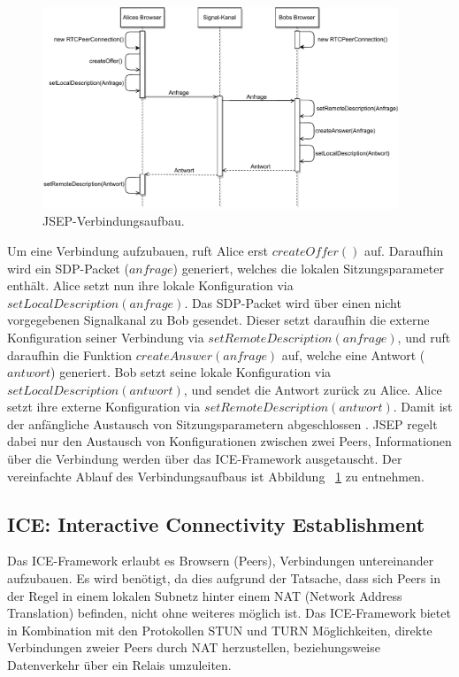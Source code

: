\begin{figure}[h]
\centering
\includegraphics[width=0.95\textwidth]{bilder/PDF_SVG/JSEP.pdf}
\caption{\acs{JSEP}-Verbindungsaufbau.}
\label{fig:jsep}
\end{figure}

Um eine Verbindung aufzubauen, ruft Alice erst $createOffer()$ auf. Daraufhin wird ein SDP-Packet ($anfrage$) generiert, welches die lokalen Sitzungsparameter enthält. Alice setzt nun ihre lokale Konfiguration via $setLocalDescription(anfrage)$. Das \acs{SDP}-Packet wird über einen nicht vorgegebenen Signalkanal zu Bob gesendet. Dieser setzt daraufhin die externe Konfiguration seiner Verbindung via $setRemoteDescription(anfrage)$, und ruft daraufhin die Funktion $createAnswer(anfrage)$ auf, welche eine Antwort ($antwort$) generiert. Bob setzt seine lokale Konfiguration via $setLocalDescription(antwort)$, und sendet die Antwort zurück zu Alice. Alice setzt ihre externe Konfiguration via $setRemoteDescription(antwort)$. Damit ist der anfängliche Austausch von Sitzungsparametern abgeschlossen \cite{altanai2014}. \acs{JSEP} regelt dabei nur den Austausch von Konfigurationen zwischen zwei Peers, Informationen über die Verbindung werden über das \acs{ICE}-Framework ausgetauscht. Der vereinfachte Ablauf des Verbindungsaufbaus ist Abbildung ~\ref{fig:jsep} zu entnehmen.

\subsection{ICE: Interactive Connectivity Establishment}
Das \acf{ICE}-Framework erlaubt es Browsern (Peers), Verbindungen untereinander aufzubauen. Es wird benötigt, da dies aufgrund der Tatsache, dass sich Peers in der Regel in einem lokalen Subnetz hinter einem \acs{NAT} (Network Address Translation) befinden, nicht ohne weiteres möglich ist. Das \acs{ICE}-Framework bietet in Kombination mit den Protokollen \acs{STUN} und \acs{TURN} Möglichkeiten, direkte Verbindungen zweier Peers durch \acs{NAT} herzustellen, beziehungsweise Datenverkehr über ein Relais umzuleiten.\par

